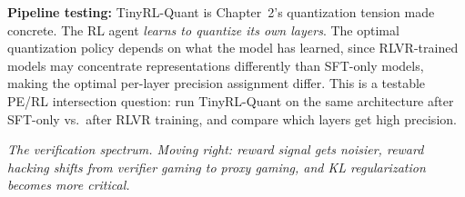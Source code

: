 \textbf{Pipeline testing:} TinyRL-Quant is Chapter~2's quantization tension made concrete. The RL agent \textit{learns to quantize its own layers}. The optimal quantization policy depends on what the model has learned, since RLVR-trained models may concentrate representations differently than SFT-only models, making the optimal per-layer precision assignment differ. This is a testable PE/RL intersection question: run TinyRL-Quant on the same architecture after SFT-only vs.\ after RLVR training, and compare which layers get high precision.


\medskip

\begin{center}
\end{center}

\smallskip
\begin{center}
\textit{\small The verification spectrum. Moving right: reward signal gets noisier, reward hacking shifts from verifier gaming to proxy gaming, and KL regularization becomes more critical.}
\end{center}

